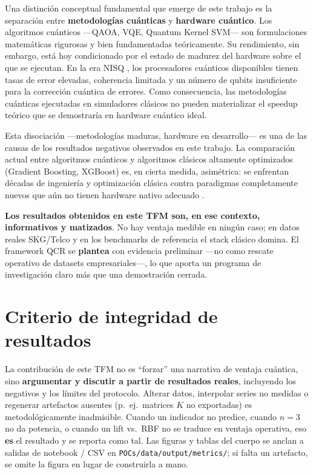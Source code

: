 Una distinción conceptual fundamental que emerge de este trabajo es la separación entre \textbf{metodologías cuánticas} y \textbf{hardware cuántico}. Los algoritmos cuánticos ---QAOA, VQE, Quantum Kernel SVM--- son formulaciones matemáticas rigurosas y bien fundamentadas teóricamente. Su rendimiento, sin embargo, está hoy condicionado por el estado de madurez del hardware sobre el que se ejecutan. En la era NISQ \citep{preskill2018}, los procesadores cuánticos disponibles tienen tasas de error elevadas, coherencia limitada y un número de qubits insuficiente para la corrección cuántica de errores. Como consecuencia, las metodologías cuánticas ejecutadas en simuladores clásicos no pueden materializar el speedup teórico que se demostraría en hardware cuántico ideal.

Esta disociación ---metodologías maduras, hardware en desarrollo--- es una de las causas de los resultados negativos observados en este trabajo. La comparación actual entre algoritmos cuánticos y algoritmos clásicos altamente optimizados (Gradient Boosting, XGBoost) es, en cierta medida, asimétrica: se enfrentan décadas de ingeniería y optimización clásica contra paradigmas completamente nuevos que aún no tienen hardware nativo adecuado \citep{biamonte2017, cerezo2021}.

\textbf{Los resultados obtenidos en este TFM son, en ese contexto, informativos y matizados}. No hay ventaja medible en ningún caso; en datos reales SKG/Telco y en los benchmarks de referencia el stack clásico domina. El framework QCR se \textbf{plantea} con evidencia preliminar ---no como rescate operativo de datasets empresariales---, lo que aporta un programa de investigación claro más que una demostración cerrada.

\section{Criterio de integridad de resultados}

La contribución de este TFM no es ``forzar'' una narrativa de ventaja cuántica, sino \textbf{argumentar y discutir a partir de resultados reales}, incluyendo los negativos y los límites del protocolo. Alterar datos, interpolar series no medidas o regenerar artefactos ausentes (p.~ej.\ matrices $K$ no exportadas) es metodológicamente inadmisible. Cuando un indicador no predice, cuando $n=3$ no da potencia, o cuando un lift vs.\ RBF no se traduce en ventaja operativa, eso \textbf{es} el resultado y se reporta como tal. Las figuras y tablas del cuerpo se anclan a salidas de notebook / CSV en \texttt{POCs/data/output/metrics/}; si falta un artefacto, se omite la figura en lugar de construirla a mano.

